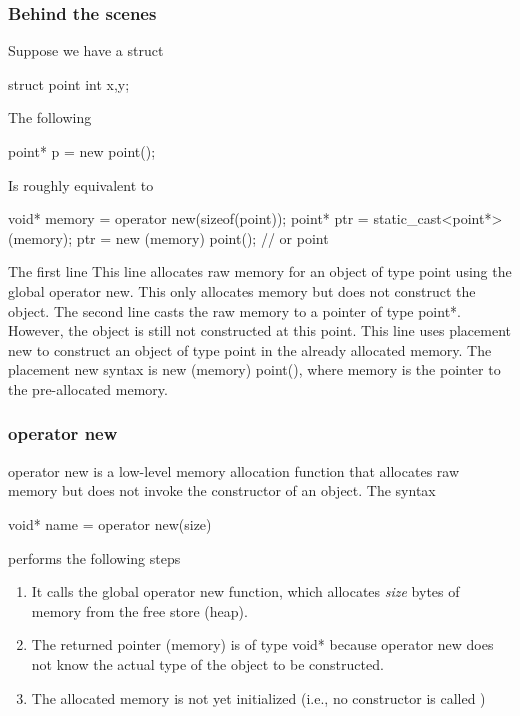\documentclass{report}
\begin{document}
    \subsubsection{Behind the scenes}
    \bigbreak \noindent 
    Suppose we have a struct
    \bigbreak \noindent 
    \begin{cppcode}
        struct point {
            int x{},y{};
        }
    \end{cppcode}
    \bigbreak \noindent 
    The following
    \bigbreak \noindent 
    \begin{cppcode}
        point* p = new point();
    \end{cppcode}
    \bigbreak \noindent 
    Is roughly equivalent to
    \bigbreak \noindent 
    \begin{cppcode}
        void* memory = operator new(sizeof(point));
        point* ptr = static_cast<point*>(memory);
        ptr = new (memory) point(); // or point{}
    \end{cppcode}
    \bigbreak \noindent 
    The first line This line allocates raw memory for an object of type point using the global operator new. This only allocates memory but does not construct the object.
    \bigbreak \noindent 
    The second line casts the raw memory to a pointer of type point*. However, the object is still not constructed at this point.
    \bigbreak \noindent 
    This line uses placement new to construct an object of type point in the already allocated memory. The placement new syntax is new (memory) point(), where memory is the pointer to the pre-allocated memory.
    \bigbreak \noindent 
    \subsubsection{operator new}
    \bigbreak \noindent 
    operator new is a low-level memory allocation function that allocates raw memory but does not invoke the constructor of an object. The syntax
    \bigbreak \noindent 
    \begin{cppcode}
    void* name = operator new(size)
    \end{cppcode}
    \bigbreak \noindent 
    performs the following steps
    \begin{enumerate}
        \item It calls the global operator new function, which allocates \textit{size} bytes of memory from the free store (heap).
        \item The returned pointer (memory) is of type void* because operator new does not know the actual type of the object to be constructed.
        \item The allocated memory is not yet initialized (i.e., no constructor is called )
    \end{enumerate}
\end{document}
